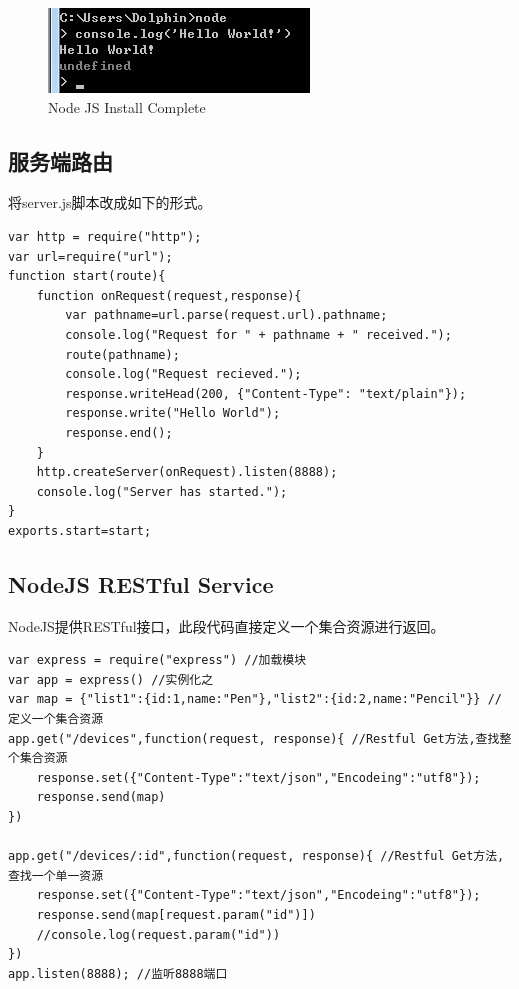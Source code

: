 \documentclass{book}
\begin{document}
\begin{figure}[htbp]
	\centering
	\includegraphics[scale=1]{NodeJSInstallCompelete.jpg}
	\caption{Node JS Install Complete}
	\label{fig:NodeJSInstallCompelete}
\end{figure}


\subsection{服务端路由}

将server.js脚本改成如下的形式。

\begin{lstlisting}[language=VBScript]
var http = require("http");
var url=require("url");
function start(route){
	function onRequest(request,response){
		var pathname=url.parse(request.url).pathname;		
		console.log("Request for " + pathname + " received.");		
		route(pathname);		
		console.log("Request recieved.");
		response.writeHead(200, {"Content-Type": "text/plain"});
		response.write("Hello World");
		response.end();
	}	
	http.createServer(onRequest).listen(8888);
	console.log("Server has started.");
}
exports.start=start;
\end{lstlisting}

\subsection{NodeJS RESTful Service}

NodeJS提供RESTful接口，此段代码直接定义一个集合资源进行返回。

\begin{lstlisting}[language=VBScript]
var express = require("express") //加载模块
var app = express() //实例化之
var map = {"list1":{id:1,name:"Pen"},"list2":{id:2,name:"Pencil"}} //定义一个集合资源
app.get("/devices",function(request, response){ //Restful Get方法,查找整个集合资源
    response.set({"Content-Type":"text/json","Encodeing":"utf8"});
    response.send(map)
})

app.get("/devices/:id",function(request, response){ //Restful Get方法,查找一个单一资源
    response.set({"Content-Type":"text/json","Encodeing":"utf8"});
    response.send(map[request.param("id")])
    //console.log(request.param("id"))
})
app.listen(8888); //监听8888端口
\end{lstlisting}
\end{document}
